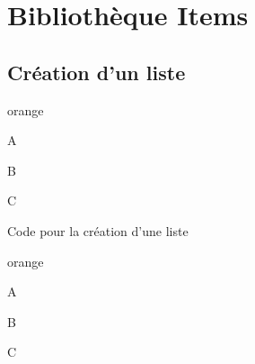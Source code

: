 \chapter {Bibliothèque Items}

\section{Création d'un liste}

\begin{items}{orange}{\Triangle}
    \item A
    \item B
    \item C
\end{items}

\begin{Latex}{Code pour la création d'une liste}
\begin{items}{orange}{\Triangle}
    \item A
    \item B
    \item C
\end{items}
\end{Latex}

